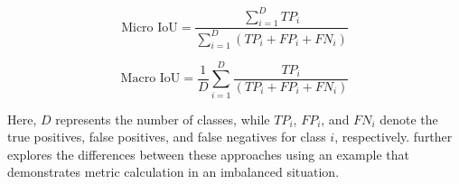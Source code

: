 \begin{equation}
    \text{Micro IoU} = \frac{\sum_{i=1}^{D} TP_i}{\sum_{i=1}^{D} (TP_i + FP_i + FN_i)}
    \label{eqn:micro_iou}
\end{equation}

\begin{equation}
    \text{Macro IoU} = \frac{1}{D} \sum_{i=1}^{D} \frac{TP_i}{(TP_i + FP_i + FN_i)}
    \label{eqn:macro_iou}
\end{equation}

Here, $D$ represents the number of classes, while $TP_i$, $FP_i$, and $FN_i$ denote the true positives, false positives, and false negatives for class $i$, respectively.  further explores the differences between these approaches using an example that demonstrates metric calculation in an imbalanced situation.


